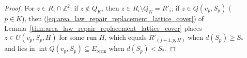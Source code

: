 \begin{proof}
    \leanok
    For $z\in R_i\cap\mathbb Z^2$: if $z\notin Q_K$, then $z\in R_i\setminus Q_K=R'_i$;
    if $z\in Q(v_p,S_p)$ ($p\in K$), then (\ref{eq:area_law_repair_replacement_lattice_cover}) of
    Lemma~\ref{thm:area_law_repair_replacement_lattice_cover} places $z\in U(v_p,S_p,H)$ for some
    run $H$, which equals $R'_{(j+1,p,H)}$ when $d(S_p)\ge S_*$ and lies in
    $\operatorname{int}Q(v_p,S_p)\subseteq E_{\mathrm{term}}$ when $d(S_p)<S_*$.
\end{proof}

